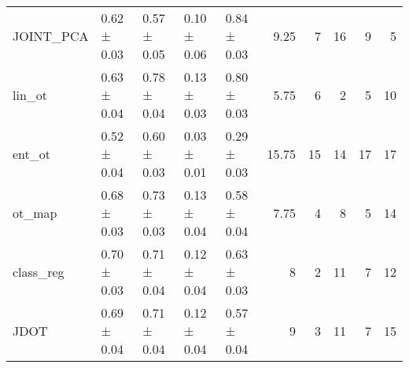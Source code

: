 \begin{tabular}{lllllrrrrr}
 JOINT\_PCA & 0.62 ± 0.03 & 0.57 ± 0.05 & 0.10 ± 0.06 & 0.84 ± 0.03 &          9.25 &                    7 &                     16 &               9 &                   5 \\
 lin\_ot    & 0.63 ± 0.04 & 0.78 ± 0.04 & 0.13 ± 0.03 & 0.80 ± 0.03 &          5.75 &                    6 &                      2 &               5 &                  10 \\
 ent\_ot    & 0.52 ± 0.04 & 0.60 ± 0.03 & 0.03 ± 0.01 & 0.29 ± 0.03 &         15.75 &                   15 &                     14 &              17 &                  17 \\
 ot\_map    & 0.68 ± 0.03 & 0.73 ± 0.03 & 0.13 ± 0.04 & 0.58 ± 0.04 &          7.75 &                    4 &                      8 &               5 &                  14 \\
 class\_reg & 0.70 ± 0.03 & 0.71 ± 0.04 & 0.12 ± 0.04 & 0.63 ± 0.03 &          8    &                    2 &                     11 &               7 &                  12 \\
 JDOT      & 0.69 ± 0.04 & 0.71 ± 0.04 & 0.12 ± 0.04 & 0.57 ± 0.04 &          9    &                    3 &                     11 &               7 &                  15 \\
\hline
\end{tabular}